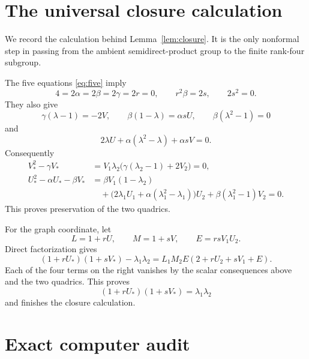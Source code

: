 \documentclass[11pt]{amsart}
\theoremstyle{definition}
\theoremstyle{remark}
\begin{document}
\section{The universal closure calculation}\label{app:closure}

We record the calculation behind Lemma~\ref{lem:closure}.  It is the only
nonformal step in passing from the ambient semidirect-product group to the
finite rank-four subgroup.

The five equations \eqref{eq:five} imply
\[
 4=2\alpha=2\beta=2\gamma=2r=0,\qquad
 r^2\beta=2s,\qquad 2s^2=0.
\]
They also give
\[
 \gamma(\lambda-1)=-2V,\qquad
 \beta(1-\lambda)=\alpha sU,\qquad
 \beta(\lambda^2-1)=0
\]
and
\[
 2\lambda U+\alpha(\lambda^2-\lambda)+\alpha sV=0.
\]
Consequently
\begin{align*}
 V_*^2-\gamma V_*
 &=V_1\lambda_2
   \bigl(\gamma(\lambda_2-1)+2V_2\bigr)=0,\\
 U_*^2-\alpha U_*-\beta V_*
 &=\beta V_1(1-\lambda_2)\\
 &\quad+
 \bigl(2\lambda_1U_1+\alpha(\lambda_1^2-\lambda_1)\bigr)U_2
 +\beta(\lambda_1^2-1)V_2=0.
\end{align*}
This proves preservation of the two quadrics.

For the graph coordinate, let
\[
 L=1+rU,\qquad M=1+sV,\qquad E=rsV_1U_2.
\]
Direct factorization gives
\[
 (1+rU_*)(1+sV_*)-\lambda_1\lambda_2
 =L_1M_2E(2+rU_2+sV_1+E).
\]
Each of the four terms on the right vanishes by the scalar consequences
above and the two quadrics.  This proves
\[
 (1+rU_*)(1+sV_*)=\lambda_1\lambda_2
\]
and finishes the closure calculation.

\section{Exact computer audit}
\end{document}
